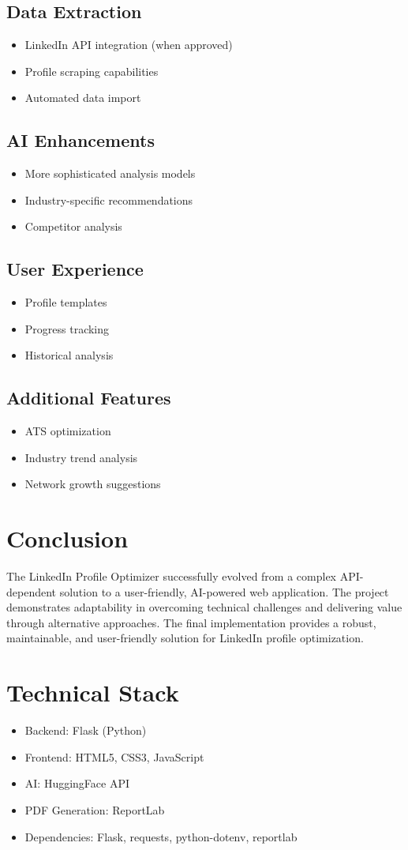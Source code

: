 \documentclass[12pt,a4paper]{article}
\begin{document}
\subsection{Data Extraction}
\begin{itemize}
    \item LinkedIn API integration (when approved)
    \item Profile scraping capabilities
    \item Automated data import
\end{itemize}

\subsection{AI Enhancements}
\begin{itemize}
    \item More sophisticated analysis models
    \item Industry-specific recommendations
    \item Competitor analysis
\end{itemize}

\subsection{User Experience}
\begin{itemize}
    \item Profile templates
    \item Progress tracking
    \item Historical analysis
\end{itemize}

\subsection{Additional Features}
\begin{itemize}
    \item ATS optimization
    \item Industry trend analysis
    \item Network growth suggestions
\end{itemize}

\section{Conclusion}
The LinkedIn Profile Optimizer successfully evolved from a complex API-dependent solution to a user-friendly, AI-powered web application. The project demonstrates adaptability in overcoming technical challenges and delivering value through alternative approaches. The final implementation provides a robust, maintainable, and user-friendly solution for LinkedIn profile optimization.

\section{Technical Stack}
\begin{itemize}
    \item Backend: Flask (Python)
    \item Frontend: HTML5, CSS3, JavaScript
    \item AI: HuggingFace API
    \item PDF Generation: ReportLab
    \item Dependencies: Flask, requests, python-dotenv, reportlab
\end{itemize}
\end{document}
